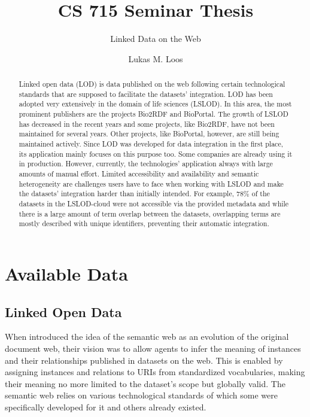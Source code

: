 \documentclass[runningheads]{llncs}
\begin{document}
%
    \title{CS 715 Seminar Thesis}
    \subtitle{Linked Data on the Web}
%
%
    \author{Lukas M. Loos}
%
%
%
    \maketitle              %
%
    \begin{abstract}
        Linked open data (LOD) is data published on the web following certain technological standards that are supposed to facilitate the datasets' integration.
        LOD has been adopted very extensively in the domain of life sciences (LSLOD).
        In this area, the most prominent publishers are the projects Bio2RDF and BioPortal.
        The growth of LSLOD has decreased in the recent years and some projects, like Bio2RDF, have not been maintained for several years.
        Other projects, like BioPortal, however, are still being maintained actively.
        Since LOD was developed for data integration in the first place, its application mainly focuses on this purpose too.
        Some companies are already using it in production.
        However, currently, the technologies' application always with large amounts of manual effort.
        Limited accessibility and availability and semantic heterogeneity are challenges users have to face when working with LSLOD and make the datasets' integration harder than initially intended.
        For example, $78\%$ of the datasets in the LSLOD-cloud were not accessible via the provided metadata and while there is a large amount of term overlap between the datasets, overlapping terms are mostly described with unique identifiers, preventing their automatic integration.

    \end{abstract}


    \section{Available Data}

    \subsection{Linked Open Data}
    When \citet{berners2001semantic} introduced the idea of the semantic web as an evolution of the original document web, their vision was to allow agents to infer the meaning of instances and their relationships published in datasets on the web.
    This is enabled by assigning instances and relations to URIs from standardized vocabularies, making their meaning no more limited to the dataset's scope but globally valid.
    The semantic web relies on various technological standards of which some were specifically developed for it and others already existed.
\end{document}
